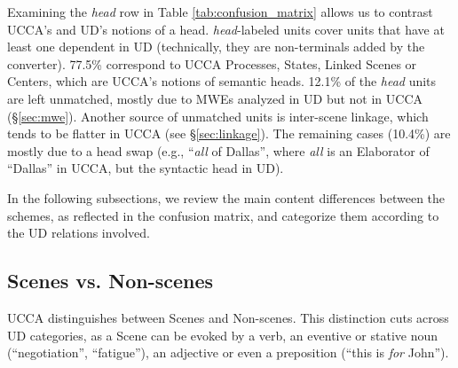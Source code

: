 \documentclass[11pt,a4paper]{article}
\begin{document}
Examining the {\it head} row in Table \ref{tab:confusion_matrix} allows
us to contrast UCCA's and UD's notions of a head. 
{\it head}-labeled units cover units that have at least
one dependent in UD (technically, they are non-terminals added by the converter).
77.5\% correspond to UCCA Processes, States, Linked Scenes or Centers,
which are UCCA's notions of semantic heads.
12.1\% of the {\it head} units are left unmatched, mostly due to MWEs analyzed in
UD but not in UCCA (\S\ref{sec:mwe}).
Another source of unmatched units is inter-scene linkage, which tends to be flatter in
UCCA (see \S\ref{sec:linkage}).
The remaining cases (10.4\%) are mostly due to a head swap (e.g., ``\textit{all} of Dallas'', where \textit{all} 
is an Elaborator of ``Dallas'' in UCCA, but the syntactic head in UD).

In the following subsections, we review the main content differences between the schemes,
as reflected in the confusion matrix, and categorize them according to the UD relations
involved.


\subsection{Scenes vs. Non-scenes}\label{sec:scenes}

UCCA distinguishes between Scenes and Non-scenes. 
This distinction cuts across UD categories,
as a Scene can be evoked by a verb, an eventive or stative
noun (``negotiation'', ``fatigue''),
an adjective or even a preposition (``this is \textit{for} John'').
\end{document}
